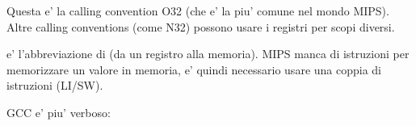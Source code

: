 Questa e' la calling convention O32 (che e' la piu' comune nel mondo MIPS).
Altre calling conventions (come N32) possono usare i registri per scopi diversi.


 e' l'abbreviazione di  (da un registro alla memoria).
MIPS manca di istruzioni per memorizzare un valore in memoria, e' quindi necessario usare una coppia di istruzioni (LI/SW).






\NonOptimizing GCC e' piu' verboso:




